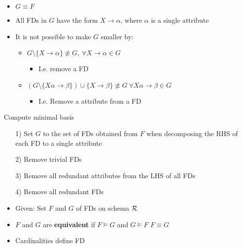 \begin{itemize}
\begin{itemize}
\begin{itemize}
                    \item $G \equiv F$
                    \item All FDs in $G$ have the form $X \to \alpha$, where $\alpha$ is a single attribute
                    \item It is not possible to make $G$ smaller by:
                        \begin{itemize}
                            \item $G \setminus \{X \to \alpha\} \not\equiv G, \ \forall X \to \alpha \in G$
                                \begin{itemize}
                                    \item I.e. remove a FD
                                \end{itemize}
                            \item $(G \setminus \{X\alpha \to \beta\}) \cup \{X \to \beta\} \not\equiv G\ \forall X\alpha \to \beta \in G$
                                \begin{itemize}
                                    \item I.e. Remove a attribute from a FD
                                \end{itemize}
                        \end{itemize}
                \end{itemize}
             Compute minimal basis
                \begin{itemize}
                    \item[1)] Set $G$ to the set of FDs obtained from $F$ when decomposing the RHS of each FD to a single attribute
                    \item[2)] Remove trivial FDs
                    \item[3)] Remove all redundant attributes from the LHS of all FDs
                    \item[4)] Remove all redundant FDs
                \end{itemize}
        \end{itemize}
        \begin{itemize}
            \item Given: Set $F$ and $G$ of FDs on schema $\mathcal{R}$
            \item $F$ and $G$ are \textbf{equivalent} if $F \models G$ and $G \models F$
             $F \equiv G$
    \item Cardinalities define FD

\end{itemize}
\end{itemize}
